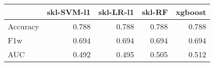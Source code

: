 \begin{tabular}{lrrrr}
\toprule
{} &  skl-SVM-l1 &  skl-LR-l1 &  skl-RF &  xgboost \\
\midrule
Accuracy &       0.788 &      0.788 &   0.788 &    0.788 \\
F1w      &       0.694 &      0.694 &   0.694 &    0.694 \\
AUC      &       0.492 &      0.495 &   0.505 &    0.512 \\
\bottomrule
\end{tabular}
